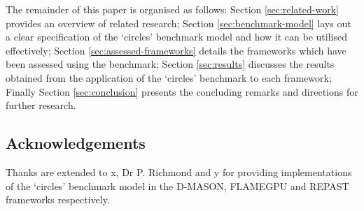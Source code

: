   The remainder of this paper is organised as follows: Section \ref{sec:related-work} provides an overview of related research; Section \ref{sec:benchmark-model} lays out a clear specification of the `circles' benchmark model and how it can be utilised effectively; Section \ref{sec:assessed-frameworks} details the frameworks which have been assessed using the benchmark; Section \ref{sec:results} discusses the results obtained from the application of the `circles' benchmark to each framework; Finally Section \ref{sec:conclusion} presents the concluding remarks and directions for further research.
  
  \subsection*{Acknowledgements}
    Thanks are extended to x, Dr P. Richmond and y for providing implementations of the `circles' benchmark model in the D-MASON, FLAMEGPU and REPAST frameworks respectively.
